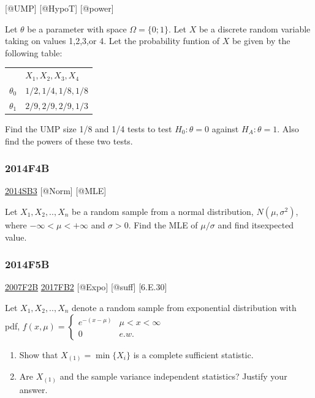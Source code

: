 \documentclass[6pt,twocolumn,Portrait]{article}
\begin{document}
{[}@UMP{]} {[}@HypoT{]} {[}@power{]}

Let \(\theta\) be a parameter with space \(\Omega=\{0; 1\}\). Let \(X\)
be a discrete random variable taking on values 1,2,3,or 4. Let the
probability funtion of \(X\) be given by the following table:

\begin{tabular}{l|l}
&$X_1,X_2,X_3,X_4$\\
$\theta_0$&$1/2,1/4,1/8,1/8$\\
$\theta_1$&$2/9,2/9,2/9,1/3$\\
\end{tabular}

Find the UMP size 1/8 and 1/4 tests to test \(H_0:\theta=0\) against
\(H_A:\theta=1\). Also find the powers of these two tests.

\hypertarget{f4b-1}{%
\subsubsection{2014F4B}\label{f4b-1}}

\protect\hyperlink{sb3-2}{2014SB3} {[}@Norm{]} {[}@MLE{]}

Let \(X_1,X_2,..,X_{n}\) be a random sample from a normal distribution,
\(N(\mu,\sigma^2)\), where \(-\infty<\mu<+\infty\) and \(\sigma>0\).
Find the MLE of \(\mu/\sigma\) and find itsexpected value.

\hypertarget{f5b-1}{%
\subsubsection{2014F5B}\label{f5b-1}}

\protect\hyperlink{f2b}{2007F2B} \protect\hyperlink{fb2-3}{2017FB2}
{[}@Expo{]} {[}@suff{]} {[}6.E.30{]}

Let \(X_1,X_2,..,X_{n}\) denote a random sample from exponential
distribution with pdf,
\(f(x,\mu)=\begin{cases}e^{-(x-\mu)}& \mu<x<\infty\\0& e.w.\end{cases}\)

\begin{enumerate}
\def\labelenumi{(\alph{enumi})}
\item
  Show that \(X_{(1)}=\min\{X_i\}\) is a complete sufficient statistic.
\item
  Are \(X_{(1)}\) and the sample variance independent statistics?
  Justify your answer.
\end{enumerate}
\end{document}
